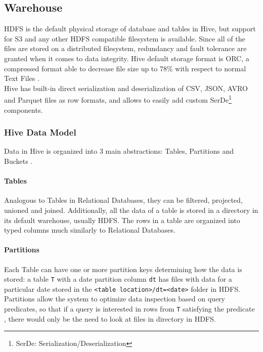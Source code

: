 \subsection{Warehouse}
HDFS is the default physical storage of database and tables in Hive, but support for S3 and any other HDFS compatible filesystem is available. Since all of the files are stored on a distributed filesystem, redundancy and fault tolerance are granted when it comes to data integrity. Hive default storage format is ORC, a compressed format able to decrease file size up to 78\% with respect to normal Text Files \cite{orc_format}.\\
Hive has built-in direct serialization and deserialization of CSV, JSON, AVRO and Parquet files as row formats, and allows to easily add custom SerDe\footnote{SerDe: Serialization/Deserialization} components.

\subsubsection{Hive Data Model}

Data in Hive is organized into 3 main abstractions: Tables, Partitions and Buckets \cite{hive_design}.

\paragraph{Tables} Analogous to Tables in Relational Databases, they can be filtered, projected, unioned and joined. Additionally, all the data of a table is stored in a directory in its default warehouse, usually HDFS. The rows in a table are organized into typed columns much similarly to Relational Databases.
\paragraph{Partitions} Each Table can have one or more partition keys determining how the data is stored: a table \texttt{T} with a date partition column \texttt{dt} has files with data for a particular date stored in the \texttt{<table location>/dt=<date>} folder in HDFS. Partitions allow the system to optimize data inspection based on query predicates, so that if a query is interested in rows from \texttt{T} satisfying the predicate \texttt{}, there would only be the need to look at files in \texttt{} directory in HDFS.
